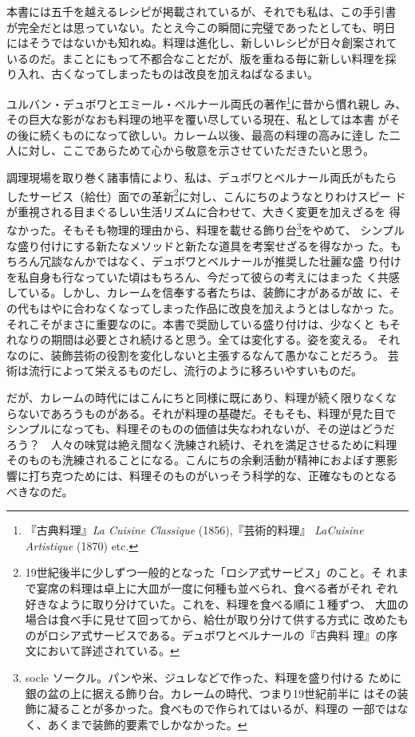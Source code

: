 \documentclass[twoside,12Q,b5paper,tombo]{ltjsbook}
\begin{document}
本書には五千を越えるレシピが掲載されているが、それでも私は、この手引書
が完全だとは思っていない。たとえ今この瞬間に完璧であったとしても、明日
にはそうではないかも知れぬ。料理は進化し、新しいレシピが日々創案されて
いるのだ。まことにもって不都合なことだが、版を重ねる毎に新しい料理を採
り入れ、古くなってしまったものは改良を加えねばなるまい。

ユルバン・デュボワとエミール・ベルナール両氏の著作\footnote{『古典料理』\emph{La
  Cuisine Classique} (1856),『芸術的料理』 \emph{LaCuisine Artistique}
  (1870) etc.}に昔から慣れ親し
み、その巨大な影がなおも料理の地平を覆い尽している現在、私としては本書
がその後に続くものになって欲しい。カレーム以後、最高の料理の高みに逹し
た二人に対し、ここであらためて心から敬意を示させていただきたいと思う。

調理現場を取り巻く諸事情により、私は、デュボワとベルナール両氏がもたら
したサービス（給仕）面での革新\footnote{19世紀後半に少しずつ一般的となった「ロシア式サービス」のこと。そ
  れまで宴席の料理は卓上に大皿が一度に何種も並べられ、食べる者がそれ
  ぞれ好きなように取り分けていた。これを、料理を食べる順に１種ずつ、
  大皿の場合は食べ手に見せて回ってから、給仕が取り分けて供する方式に
  改めたものがロシア式サービスである。デュボワとベルナールの『古典料
  理』の序文において詳述されている。}に対し、こんにちのようなとりわけスピー
ドが重視される目まぐるしい生活リズムに合わせて、大きく変更を加えざるを
得なかった。そもそも物理的理由から、料理を載せる飾り台\footnote{socle
  ソークル。パンや米、ジュレなどで作った、料理を盛り付ける
  ために銀の盆の上に据える飾り台。カレームの時代、つまり19世紀前半に
  はその装飾に凝ることが多かった。食べもので作られてはいるが、料理の
  一部ではなく、あくまで装飾的要素でしかなかった。}をやめて、
シンプルな盛り付けにする新たなメソッドと新たな道具を考案せざるを得なかっ
た。もちろん冗談なんかではなく、デュボワとベルナールが推奨した壮麗な盛
り付けを私自身も行なっていた頃はもちろん、今だって彼らの考えにはまった
く共感している。しかし、カレームを信奉する者たちは、装飾に才があるが故
に、その代もはやに合わなくなってしまった作品に改良を加えようとはしなかっ
た。それこそがまさに重要なのに。本書で奨励している盛り付けは、少なくと
もそれなりの期間は必要とされ続けると思う。全ては変化する。姿を変える。
それなのに、装飾芸術の役割を変化しないと主張するなんて愚かなことだろう。
芸術は流行によって栄えるものだし、流行のように移ろいやすいものだ。

だが、カレームの時代にはこんにちと同様に既にあり、料理が続く限りなくな
らないであろうものがある。それが料理の基礎だ。そもそも、料理が見た目で
シンプルになっても、料理そのものの価値は失なわれないが、その逆はどうだ
ろう？　人々の味覚は絶え間なく洗練され続け、それを満足させるために料理
そのものも洗練されることになる。こんにちの余剰活動が精神におよぼす悪影
響に打ち克つためには、料理そのものがいっそう科学的な、正確なものとなる
べきなのだ。
\end{document}

